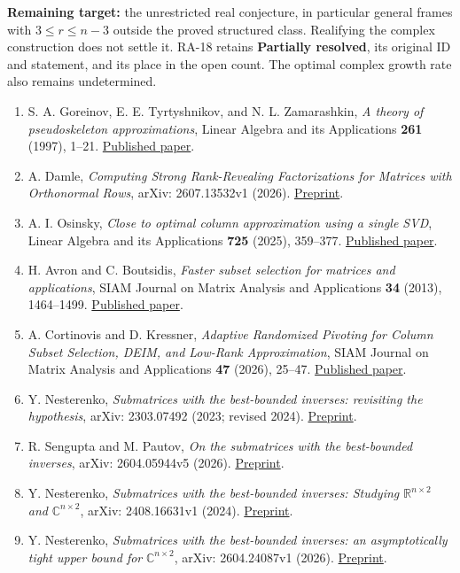 \documentclass[11pt,a4paper]{article}
\makeatletter
\providecommand{\tightlist}{\setlength{\itemsep}{0pt}\setlength{\parskip}{0pt}}
\renewcommand{\subsection}{\Needspace{4\baselineskip}\@startsection{subsection}{2}{0pt}{9pt plus 1pt minus 1pt}{3pt}{\sffamily\bfseries\normalsize\color{ink}}}
\makeatother
\begin{document}
\textbf{Remaining target:} the unrestricted real conjecture, in
particular general frames with \(3\le r\le n-3\) outside the proved
structured class. Realifying the complex construction does not settle
it. RA-18 retains \textbf{Partially resolved}, its original ID and
statement, and its place in the open count. The optimal complex growth
rate also remains undetermined.

\subsection{References}\label{references}

\begin{enumerate}
\def\labelenumi{\arabic{enumi}.}
\tightlist
\item
  S. A. Goreinov, E. E. Tyrtyshnikov, and N. L. Zamarashkin, \emph{A
  theory of pseudoskeleton approximations}, Linear Algebra and its
  Applications \textbf{261} (1997), 1--21.
  \href{https://doi.org/10.1016/S0024-3795(96)00301-1}{Published paper}.
\item
  A. Damle, \emph{Computing Strong Rank-Revealing Factorizations for
  Matrices with Orthonormal Rows}, arXiv: 2607.13532v1 (2026).
  \href{https://arxiv.org/pdf/2607.13532v1}{Preprint}.
\item
  A. I. Osinsky, \emph{Close to optimal column approximation using a
  single SVD}, Linear Algebra and its Applications \textbf{725} (2025),
  359--377. \href{https://doi.org/10.1016/j.laa.2025.07.016}{Published
  paper}.
\item
  H. Avron and C. Boutsidis, \emph{Faster subset selection for matrices
  and applications}, SIAM Journal on Matrix Analysis and Applications
  \textbf{34} (2013), 1464--1499.
  \href{https://doi.org/10.1137/120867287}{Published paper}.
\item
  A. Cortinovis and D. Kressner, \emph{Adaptive Randomized Pivoting for
  Column Subset Selection, DEIM, and Low-Rank Approximation}, SIAM
  Journal on Matrix Analysis and Applications \textbf{47} (2026),
  25--47. \href{https://doi.org/10.1137/24M1719189}{Published paper}.
\item
  Y. Nesterenko, \emph{Submatrices with the best-bounded inverses:
  revisiting the hypothesis}, arXiv: 2303.07492 (2023; revised 2024).
  \href{https://arxiv.org/abs/2303.07492}{Preprint}.
\item
  R. Sengupta and M. Pautov, \emph{On the submatrices with the
  best-bounded inverses}, arXiv: 2604.05944v5 (2026).
  \href{https://arxiv.org/html/2604.05944v5}{Preprint}.
\item
  Y. Nesterenko, \emph{Submatrices with the best-bounded inverses:
  Studying \(\mathbb R^{n\times2}\) and} \(\mathbb C^{n\times2}\),
  arXiv: 2408.16631v1 (2024).
  \href{https://arxiv.org/html/2408.16631v1}{Preprint}.
\item
  Y. Nesterenko, \emph{Submatrices with the best-bounded inverses: an
  asymptotically tight upper bound for} \(\mathbb C^{n\times2}\), arXiv:
  2604.24087v1 (2026).
  \href{https://arxiv.org/html/2604.24087v1}{Preprint}.
\end{enumerate}
\end{document}
